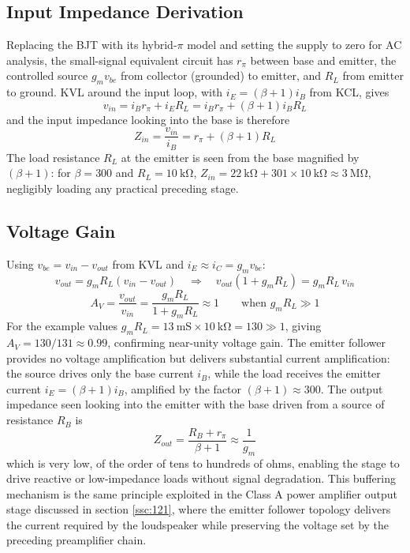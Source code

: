 \subsection{Input Impedance Derivation}
\label{ssc:741}

Replacing the BJT with its hybrid-\(\pi\) model and setting the supply to zero for AC analysis, the small-signal equivalent circuit has \(r_\pi\) between base and emitter, the controlled source \(g_m v_{be}\) from collector (grounded) to emitter, and \(R_L\) from emitter to ground.
KVL around the input loop, with \(i_E = (\beta+1)i_B\) from KCL, gives
\[
v_{in} = i_B r_\pi + i_E R_L = i_B r_\pi + (\beta+1)i_B R_L
\]
and the input impedance looking into the base is therefore
\[
Z_{in} = \frac{v_{in}}{i_B} = r_\pi + (\beta+1)R_L
\]
The load resistance \(R_L\) at the emitter is seen from the base magnified by \((\beta+1)\): for \(\beta = 300\) and \(R_L = \SI{10}{\kilo\ohm}\), \(Z_{in} = \SI{22}{\kilo\ohm} + 301 \times \SI{10}{\kilo\ohm} \approx \SI{3}{\mega\ohm}\), negligibly loading any practical preceding stage.

\subsection{Voltage Gain}
\label{ssc:742}

Using \(v_{be} = v_{in} - v_{out}\) from KVL and \(i_E \approx i_C = g_m v_{be}\):
\[
v_{out} = g_m R_L(v_{in} - v_{out}) \quad \Rightarrow \quad v_{out}(1 + g_m R_L) = g_m R_L \, v_{in}
\]
\[
A_V = \frac{v_{out}}{v_{in}} = \frac{g_m R_L}{1 + g_m R_L} \approx 1 \qquad \text{when } g_m R_L \gg 1
\]
For the example values \(g_m R_L = \SI{13}{\milli\siemens} \times \SI{10}{\kilo\ohm} = 130 \gg 1\), giving \(A_V = 130/131 \approx 0.99\), confirming near-unity voltage gain.
The emitter follower provides no voltage amplification but delivers substantial current amplification: the source drives only the base current \(i_B\), while the load receives the emitter current \(i_E = (\beta+1)i_B\), amplified by the factor \((\beta+1) \approx 300\).
The output impedance seen looking into the emitter with the base driven from a source of resistance \(R_B\) is
\[
Z_{out} = \frac{R_B + r_\pi}{\beta+1} \approx \frac{1}{g_m}
\]
which is very low, of the order of tens to hundreds of ohms, enabling the stage to drive reactive or low-impedance loads without signal degradation.
This buffering mechanism is the same principle exploited in the Class A power amplifier output stage discussed in section \ref{ssc:121}, where the emitter follower topology delivers the current required by the loudspeaker while preserving the voltage set by the preceding preamplifier chain.
